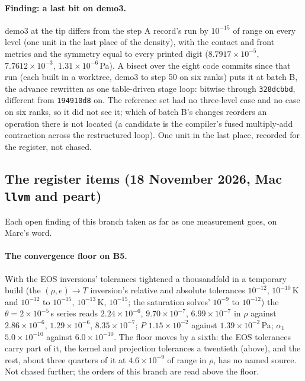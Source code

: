 \documentclass[11pt,a4paper]{article}
\newcommand{\code}[1]{\texttt{\small #1}}
\begin{document}
\paragraph{Finding: a last bit on demo3.}  demo3 at the tip differs from
the step A record's run by $10^{-15}$ of range on every level (one unit
in the last place of the density), with the contact and front metrics
and the symmetry equal to every printed digit ($8.7917\times10^{-5}$,
$7.7612\times10^{-3}$, $1.31\times10^{-6}$\,Pa).  A bisect over the
eight code commits since that run (each built in a worktree, demo3 to
step 50 on six ranks) puts it at batch B, the advance rewritten as one
table-driven stage loop: bitwise through \code{328dcbbd}, different
from \code{194910d8} on.  The reference set had no three-level case and
no case on six ranks, so it did not see it; which of batch B's changes
reorders an operation there is not located (a candidate is the
compiler's fused multiply-add contraction across the restructured
loop).  One unit in the last place, recorded for the register, not
chased.

\subsection{The register items (18 November 2026, Mac \code{llvm} and peart)}
\label{sec:register}

Each open finding of this branch taken as far as one measurement goes,
on Marc's word.

\paragraph{The convergence floor on B5.}  With the EOS inversions'
tolerances tightened a thousandfold in a temporary build (the
$(\rho,e)\to T$ inversion's relative and absolute tolerances
$10^{-12}$, $10^{-10}$\,K and $10^{-12}$ to $10^{-15}$, $10^{-13}$\,K,
$10^{-15}$; the saturation solves' $10^{-9}$ to $10^{-12}$) the
$\theta = 2\times10^{-5}$\,s series reads $2.24\times10^{-6}$,
$9.70\times10^{-7}$, $6.99\times10^{-7}$ in $\rho$ against
$2.86\times10^{-6}$, $1.29\times10^{-6}$, $8.35\times10^{-7}$; $P$
$1.15\times10^{-2}$ against $1.39\times10^{-2}$\,Pa; $\alpha_1$
$5.0\times10^{-10}$ against $6.0\times10^{-10}$.  The floor moves by a
sixth: the EOS tolerances carry part of it, the kernel and projection
tolerances a twentieth (above), and the rest, about three quarters of
it at $4.6\times10^{-9}$ of range in $\rho$, has no named source.  Not
chased further; the orders of this branch are read above the floor.
\end{document}
